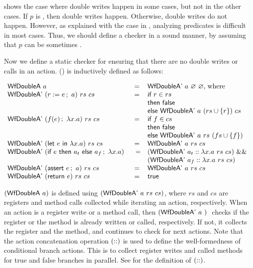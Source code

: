 shows the case where double writes
happen in some cases, but not in the other cases. If $p$ is \btrue{},
then double writes happen. Otherwise, double writes do not
happen. However, as explained with the case in
, analyzing predicates is difficult in
most cases. Thus, we should define a checker in a sound manner, by
assuming that $p$ can be sometimes \btrue{}.

Now we define a static checker for ensuring that there are no double
writes or calls in an action. () is inductively defined
as follows:

\begin{definition}
  \label{def-wfdoublea}
  \mbox{}
  \begin{center}
    \begin{math}
      \begin{array}{lcl}
        \wfdoublea{a} & = & \wfdoubleap{a}{\emptyset}{\emptyset} \textrm{, where} \\
        \wfdoubleap{(\actwrite{r}{e}{a})}{rs}{cs} & = & \wordif{} r \in rs \\
        & & \wordthen{} \bfalse{} \\
        & & \wordelse{} \wfdoubleap{a}{(\setadd{rs}{r})}{cs} \\
        \wfdoubleap{(\actcall{x}{f}{e}{a})}{rs}{cs} & = & \wordif{} f \in cs \\
        & & \wordthen{} \bfalse{} \\
        & & \wordelse{} \wfdoubleap{a}{rs}{(\setadd{fs}{f})} \\
        \wfdoubleap{(\actlet{e}{x}{a})}{rs}{cs} & = & \wfdoubleap{a}{rs}{cs} \\
        \wfdoubleap{(\actifelse{e}{a_t}{a_f}{x}{a})} & =
        & (\wfdoubleap{\concataction{a_t}{a}}{rs}{cs})\ \band{} \\
        & & (\wfdoubleap{\concataction{a_f}{a}}{rs}{cs}) \\
        \wfdoubleap{(\actassert{e}{a})}{rs}{cs} & = & \wfdoubleap{a}{rs}{cs} \\
        \wfdoubleap{(\actret{e})}{rs}{cs} & = & \btrue{} \\
      \end{array}
    \end{math}
  \end{center}
\end{definition}

$(\textsf{WfDoubleA}\ a)$ is defined using $(\textsf{WfDoubleA'}\ a\ rs\ cs)$, where
$rs$ and $cs$ are registers and method calls collected while iterating
an action, respectively. When an action is a register write or a
method call, then $(\wfdoubleap{a})$ checks if the register or the
method is already written or called, respectively. If not, it collects
the register and the method, and continues to check for next actions.
Note that the action concatenation operation $(::)$ is used
to define the well-formedness of conditional branch actions. This is
to collect register writes and called methods for true and false
branches in parallel. See  for the definition
of $(::)$.

